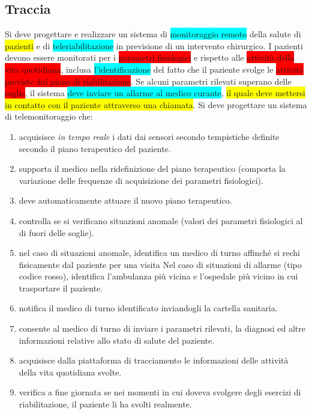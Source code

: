\documentclass[a4paper,11pt,oneside, table]{article}
\begin{document}
\subsection{Traccia}

Si deve progettare e realizzare un sistema di \colorbox{cyan}{monitoraggio remoto} della salute di \colorbox{yellow}{pazienti} e di \colorbox{cyan}{teleriabilitazione} in previsione di un intervento chirurgico.
I pazienti devono essere monitorati per i \colorbox{red}{parametri fisiologici} e rispetto alle \colorbox{red}{attività della vita quotidiana}, inclusa \colorbox{cyan}{l'identificazione} del fatto che il paziente svolge le \colorbox{red}{attività previste dal piano di riabilitazione}.
Se alcuni parametri rilevati superano delle \colorbox{red}{soglie}, il sistema \colorbox{cyan}{deve inviare un allarme al medico curante}, \colorbox{yellow}{il quale deve mettersi in contatto con il paziente attraverso una chiamata}.
Si deve progettare un sistema di telemonitoraggio che:

\begin{enumerate}
  \item acquisisce \textit{in tempo reale} i dati dai sensori secondo tempistiche definite secondo il piano terapeutico del paziente.
  \item supporta il medico nella ridefinizione del piano terapeutico (comporta la variazione delle frequenze di acquisizione dei parametri fisiologici).
  \item deve automaticamente attuare il nuovo piano terapeutico.
  \item controlla se si verificano situazioni anomale (valori dei parametri fisiologici al di fuori delle soglie).
  \item nel caso di situazioni anomale, identifica un medico di turno affinché si rechi fisicamente dal paziente per una visita Nel caso di situazioni di allarme (tipo codice rosso), identifica l'ambulanza pi\`u vicina e l'ospedale pi\`u vicino in cui trasportare il paziente.
  \item notifica il medico di turno identificato inviandogli la cartella sanitaria.
  \item consente al medico di turno di inviare i parametri rilevati, la diagnosi ed altre informazioni relative allo stato di salute del paziente.
  \item acquisisce dalla piattaforma di tracciamento le informazioni delle attività della vita quotidiana svolte.
  \item verifica a fine giornata se nei momenti in cui doveva svolgere degli esercizi di riabilitazione, il paziente li ha svolti realmente.
\end{enumerate}
\end{document}
